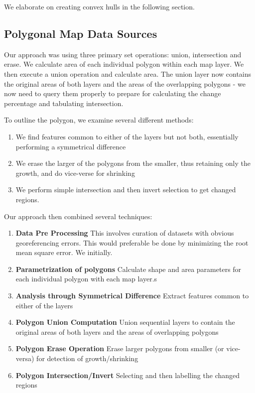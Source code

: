 \documentclass[conference]{IEEEtran}
\begin{document}
We elaborate on creating convex hulls in the following section.

\subsection{Polygonal Map Data Sources}


Our approach was using three primary set operations: union, intersection and erase. We calculate area of each individual polygon within each map layer. We then execute a union operation and calculate area. The union layer now contains the original areas of both layers and the areas of the overlapping polygons - we now need to query them properly to prepare for calculating the change percentage and tabulating intersection.

To outline the polygon, we examine several different methods:
\begin{enumerate}
	\item We find features common to either of the layers but not both, essentially performing a symmetrical difference
	\item We erase the larger of the polygons from the smaller, thus retaining only the growth, and do vice-verse for shrinking
	\item We perform simple intersection and then invert selection to get changed regions. 
\end{enumerate}

Our approach then combined several techniques:
\begin{enumerate}
	\item \textbf{Data Pre Processing} This involves curation of datasets with obvious georeferencing errors. This would preferable be done by minimizing the root mean square error. We initially.
	\item \textbf{Parametrization of polygons} Calculate shape and area parameters for each individual polygon with each map layer.s
	\item \textbf{Analysis through Symmetrical Difference} Extract features common to either of the layers
	\item \textbf{Polygon Union Computation} Union sequential layers to contain the original areas of both layers and the areas of overlapping polygons
	\item \textbf{Polygon Erase Operation} Erase larger polygons from smaller (or vice-versa) for detection of growth/shrinking
	\item \textbf{Polygon Intersection/Invert} Selecting and then labelling the changed regions
\end{enumerate}
\end{document}
